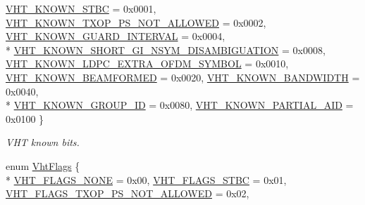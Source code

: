 \begin{DoxyCompactItemize}
\hyperlink{classns3_1_1RadiotapHeader_a3479bfa57eb27bd6e5eeb2556ab8f5a8a7d8adf3b395ad622e2ef6824ce609db7}{V\+H\+T\+\_\+\+K\+N\+O\+W\+N\+\_\+\+S\+T\+BC} = 0x0001, 
\hyperlink{classns3_1_1RadiotapHeader_a3479bfa57eb27bd6e5eeb2556ab8f5a8afa3825ea52b1b830bc3685a60954b014}{V\+H\+T\+\_\+\+K\+N\+O\+W\+N\+\_\+\+T\+X\+O\+P\+\_\+\+P\+S\+\_\+\+N\+O\+T\+\_\+\+A\+L\+L\+O\+W\+ED} = 0x0002, 
\hyperlink{classns3_1_1RadiotapHeader_a3479bfa57eb27bd6e5eeb2556ab8f5a8a7fc9564ea0ad14f0f62001929f06d3e8}{V\+H\+T\+\_\+\+K\+N\+O\+W\+N\+\_\+\+G\+U\+A\+R\+D\+\_\+\+I\+N\+T\+E\+R\+V\+AL} = 0x0004, 
\\*
\hyperlink{classns3_1_1RadiotapHeader_a3479bfa57eb27bd6e5eeb2556ab8f5a8af20289c57eabeab3196761c256fff274}{V\+H\+T\+\_\+\+K\+N\+O\+W\+N\+\_\+\+S\+H\+O\+R\+T\+\_\+\+G\+I\+\_\+\+N\+S\+Y\+M\+\_\+\+D\+I\+S\+A\+M\+B\+I\+G\+U\+A\+T\+I\+ON} = 0x0008, 
\hyperlink{classns3_1_1RadiotapHeader_a3479bfa57eb27bd6e5eeb2556ab8f5a8a9555889f53c806a88c7559d47a637e48}{V\+H\+T\+\_\+\+K\+N\+O\+W\+N\+\_\+\+L\+D\+P\+C\+\_\+\+E\+X\+T\+R\+A\+\_\+\+O\+F\+D\+M\+\_\+\+S\+Y\+M\+B\+OL} = 0x0010, 
\hyperlink{classns3_1_1RadiotapHeader_a3479bfa57eb27bd6e5eeb2556ab8f5a8aee35ae1d0986b232b16c5085a351df43}{V\+H\+T\+\_\+\+K\+N\+O\+W\+N\+\_\+\+B\+E\+A\+M\+F\+O\+R\+M\+ED} = 0x0020, 
\hyperlink{classns3_1_1RadiotapHeader_a3479bfa57eb27bd6e5eeb2556ab8f5a8a740d1500b4e9c1df563f01392a4b7945}{V\+H\+T\+\_\+\+K\+N\+O\+W\+N\+\_\+\+B\+A\+N\+D\+W\+I\+D\+TH} = 0x0040, 
\\*
\hyperlink{classns3_1_1RadiotapHeader_a3479bfa57eb27bd6e5eeb2556ab8f5a8a1d7df913d72c58e984d0f009cf54f731}{V\+H\+T\+\_\+\+K\+N\+O\+W\+N\+\_\+\+G\+R\+O\+U\+P\+\_\+\+ID} = 0x0080, 
\hyperlink{classns3_1_1RadiotapHeader_a3479bfa57eb27bd6e5eeb2556ab8f5a8a9a64f65d00252ad386ce30035f22cfc7}{V\+H\+T\+\_\+\+K\+N\+O\+W\+N\+\_\+\+P\+A\+R\+T\+I\+A\+L\+\_\+\+A\+ID} = 0x0100
 \}\begin{DoxyCompactList}\small\item\em V\+HT known bits. \end{DoxyCompactList}
\item 
enum \hyperlink{classns3_1_1RadiotapHeader_a6df30f9a6b9d20263a6e5531377eed5c}{Vht\+Flags} \{ \\*
\hyperlink{classns3_1_1RadiotapHeader_a6df30f9a6b9d20263a6e5531377eed5ca68c88b11b4361e729731affcda369704}{V\+H\+T\+\_\+\+F\+L\+A\+G\+S\+\_\+\+N\+O\+NE} = 0x00, 
\hyperlink{classns3_1_1RadiotapHeader_a6df30f9a6b9d20263a6e5531377eed5cadb77d4e25015f2144524a297927dad83}{V\+H\+T\+\_\+\+F\+L\+A\+G\+S\+\_\+\+S\+T\+BC} = 0x01, 
\hyperlink{classns3_1_1RadiotapHeader_a6df30f9a6b9d20263a6e5531377eed5ca597f895df6ef58090c79abdc4c0e9018}{V\+H\+T\+\_\+\+F\+L\+A\+G\+S\+\_\+\+T\+X\+O\+P\+\_\+\+P\+S\+\_\+\+N\+O\+T\+\_\+\+A\+L\+L\+O\+W\+ED} = 0x02, 

\end{DoxyCompactItemize}
